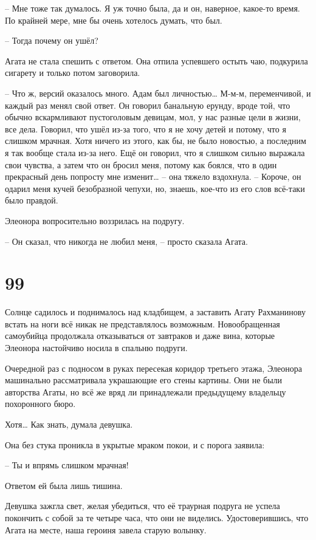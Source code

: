 \documentclass[
  a5paperpaper,
  DIV=11,
  numbers=noendperiod]{scrreprt}
\begin{document}
-- Мне тоже так думалось. Я уж точно была, да и он, наверное, какое-то
время. По крайней мере, мне бы очень хотелось думать, что был.

-- Тогда почему он ушёл?

Агата не стала спешить с ответом. Она отпила успевшего остыть чаю,
подкурила сигарету и только потом заговорила.

-- Что ж, версий оказалось много. Адам был личностью\ldots{} М-м-м,
переменчивой, и каждый раз менял свой ответ. Он говорил банальную
ерунду, вроде той, что обычно вскармливают пустоголовым девицам, мол, у
нас разные цели в жизни, все дела. Говорил, что ушёл из-за того, что я
не хочу детей и потому, что я слишком мрачная. Хотя ничего из этого, как
бы, не было новостью, а последним я так вообще стала из-за него. Ещё он
говорил, что я слишком сильно выражала свои чувства, а затем что он
бросил меня, потому как боялся, что в один прекрасный день попросту мне
изменит\ldots{} -- она тяжело вздохнула. -- Короче, он одарил меня кучей
безобразной чепухи, но, знаешь, кое-что из его слов всё-таки было
правдой.

Элеонора вопросительно воззрилась на подругу.

-- Он сказал, что никогда не любил меня, -- просто сказала Агата.

\section*{99}\label{99}


Солнце садилось и поднималось над кладбищем, а заставить Агату
Рахманинову встать на ноги всё никак не представлялось возможным.
Новообращенная самоубийца продолжала отказываться от завтраков и даже
вина, которые Элеонора настойчиво носила в спальню подруги.

Очередной раз с подносом в руках пересекая коридор третьего этажа,
Элеонора машинально рассматривала украшающие его стены картины. Они не
были авторства Агаты, но всё же вряд ли принадлежали предыдущему
владельцу похоронного бюро.

Хотя\ldots{} Как знать, думала девушка.

Она без стука проникла в укрытые мраком покои, и с порога заявила:

-- Ты и впрямь слишком мрачная!

Ответом ей была лишь тишина.

Девушка зажгла свет, желая убедиться, что её траурная подруга не успела
покончить с собой за те четыре часа, что они не виделись.
Удостоверившись, что Агата на месте, наша героиня завела старую волынку.
\end{document}
